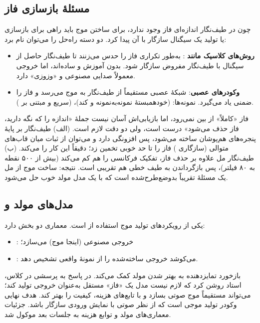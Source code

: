 \subsection{مسئلهٔ بازسازی فاز}
چون در طیف‌نگار اندازه‌ای فاز وجود ندارد، برای ساختن موج باید راهی برای بازسازی یا تولید یک سیگنال سازگار با آن پیدا کرد. دو دسته راه‌حل را می‌توان نام برد:
\begin{itemize}
  \item \textbf{روش‌های کلاسیک مانند }: به‌طور تکراری فاز را حدس می‌زنند تا طیف‌نگار حاصل از سیگنال با طیف‌نگار مفروض سازگار شود. بدون آموزش و ساده‌اند، اما خروجی معمولاً صدایی مصنوعی و «وزوزی» دارد.
  \item \textbf{وکودرهای عصبی}: شبکهٔ عصبی مستقیماً از طیف‌نگار به موج می‌رسد و فاز را ضمنی یاد می‌گیرد. نمونه‌ها:  (خودهمبستهٔ نمونه‌به‌نمونه و کند)،  (سریع و مبتنی بر ).
\end{itemize}

\begin{correctionbox}{فاز «کاملاً» از بین نمی‌رود، اما بازیابی‌اش آسان نیست}
جملهٔ «اندازه را که نگه دارید، فاز حذف می‌شود» درست است، ولی دو دقت لازم است. (الف) طیف‌نگار بر پایهٔ پنجره‌های هم‌پوشان ساخته می‌شود، پس افزونگی دارد و می‌توان از ثبات میان قاب‌های متوالی (سازگاری ) فاز را تا حد خوبی تخمین زد؛  دقیقاً این کار را می‌کند. (ب) طیف‌نگار مل علاوه بر حذف فاز، تفکیک فرکانسی را هم کم می‌کند (بیش از ۵۰۰ نقطه به ۸۰ فیلتر)، پس بازگرداندن به طیف خطی هم تقریبی است. نتیجه: ساخت موج از مل یک مسئلهٔ تقریباً بدوضع‌طرح‌شده است که با یک مدل مولد خوب حل می‌شود.
\end{correctionbox}

\subsection{مدل‌های مولد و }
یکی از رویکردهای تولید موج استفاده از  است. معماری  دو بخش دارد:
\begin{itemize}
  \item {}: خروجی مصنوعی (اینجا موج) می‌سازد؛
  \item {}: می‌کوشد خروجی ساخته‌شده را از نمونهٔ واقعی تشخیص دهد.
\end{itemize}
بازخورد تمایزدهنده به بهتر شدن مولد کمک می‌کند. در پاسخ به پرسشی در کلاس، استاد روشن کرد که لازم نیست مدل  یک «فاز» مستقل به‌عنوان خروجی تولید کند؛ می‌تواند مستقیماً موج صوتی بسازد و با تابع‌های هزینه، کیفیت را بهتر کند. هدف نهایی وکودر تولید موجی است که از نظر صوتی با نمایش ورودی سازگار باشد. جزئیات معماری‌های مولد و توابع هزینه به جلسات بعد موکول شد.

